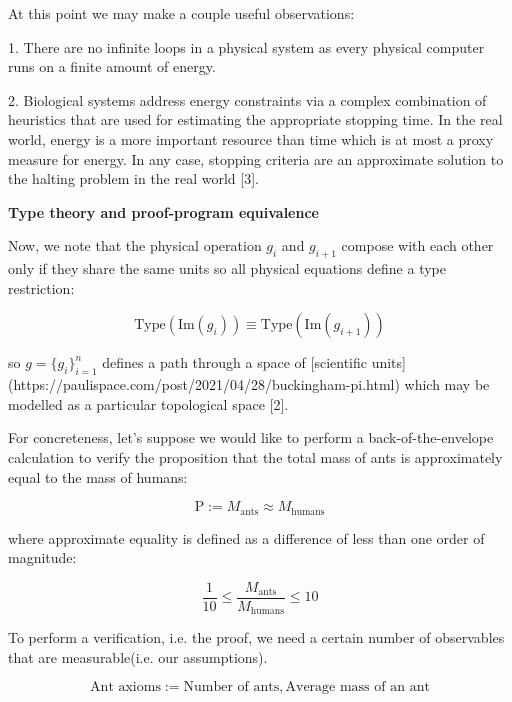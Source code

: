 \documentclass{article}
\begin{document}
At this point we may make a couple useful observations:

1. There are no infinite loops in a physical system as every physical computer runs on a finite amount of energy.

2. Biological systems address energy constraints via a complex combination of heuristics that are used for estimating
the appropriate stopping time. In the real world, energy is a more important resource than time which is at most a
proxy measure for energy. In any case, stopping criteria are an approximate solution to the halting problem in the real
world [3].

\newpage 

\textbf{Type theory and proof-program equivalence}

Now, we note that the physical operation $g_i$ and $g_{i+1}$ compose with each other only if they share the same units
so all physical equations define a type restriction:

\begin{equation}
\textrm{Type}(\textrm{Im}(g_i)) \equiv \textrm{Type}(\textrm{Im}(g_{i+1}))
\end{equation}

so $g = \{g_i\}_{i=1}^n$ defines a path through a space of [scientific units](https://paulispace.com/post/2021/04/28/buckingham-pi.html) which may be modelled as a particular topological space [2].

For concreteness, let's suppose we would like to perform a back-of-the-envelope calculation to verify the proposition that
the total mass of ants is approximately equal to the mass of humans:

\begin{equation}
\textrm{P} := M_{\textrm{ants}} \approx M_{\textrm{humans}}
\end{equation}

where approximate equality is defined as a difference of less than one order of magnitude:

\begin{equation}
\frac{1}{10} \leq \frac{M_{\textrm{ants}}}{M_{\textrm{humans}}} \leq 10
\end{equation}

To perform a verification, i.e. the proof, we need a certain number of observables that are measurable(i.e. our assumptions).

\begin{equation}
\textrm{Ant axioms} := \textrm{Number of ants}, \textrm{Average mass of an ant}
\end{equation}
\end{document}
